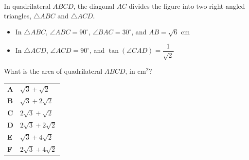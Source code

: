 \documentclass[11pt,a4paper]{article}
\begin{document}
\begin{enumerate}[label=\textbf{\arabic*.},leftmargin=*,itemsep=0pt,start=2]
\questionitem[Trigonometry]
In quadrilateral $ABCD$, the diagonal $AC$ divides the figure into two right-angled triangles, $\triangle ABC$ and $\triangle ACD$.

\begin{itemize}
    \item In $\triangle ABC$, $\angle ABC = 90^\circ$, $\angle BAC = 30^\circ$, and $AB = \sqrt{6}\text{ cm}$
    \item In $\triangle ACD$, $\angle ACD = 90^\circ$, and $\tan(\angle CAD) = \dfrac{1}{\sqrt{2}}$
\end{itemize}

What is the area of quadrilateral $ABCD$, in $\text{cm}^2$? \\

\par\vspace*{12pt}
\begin{tabularx}{\linewidth}{@{}>{\bfseries}l Y@{}}
A &
$\sqrt{3} + \sqrt{2}$
\\[0.8em]
B &
$\sqrt{3} + 2\sqrt{2}$
\\[0.8em]
C &
$2\sqrt{3} + \sqrt{2}$
\\[0.8em]
D &
$2\sqrt{3} + 2\sqrt{2}$
\\[0.8em]
E &
$\sqrt{3} + 4\sqrt{2}$
\\[0.8em]
F &
$2\sqrt{3} + 4\sqrt{2}$
\\
\end{tabularx}
\end{enumerate}
\clearpage
\thispagestyle{djspaper}
\vspace*{8pt}
\end{document}
